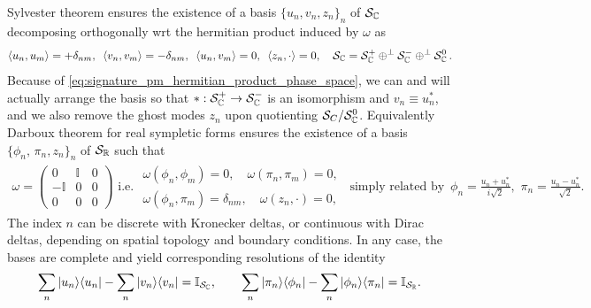 \documentclass[../QFT_main.tex]{subfiles}
\begin{document}
\begin{mytheorem}
Sylvester theorem ensures the existence of a basis $\{u_n, v_n, z_n\}_{n}$ of $\mathcal{S}_{\mathbb{C}}$ decomposing orthogonally wrt the hermitian product induced by $\omega$ as
\begin{align}\label{eq:orthogonality_bogoliubov_basis_complex_phase_space}
    \langle u_n, u_m \rangle = +\delta_{nm}, \,\,\, \langle v_n, v_m \rangle = -\delta_{nm}, \,\,\, \langle u_n, v_m \rangle = 0, \,\,\, \langle z_n, \cdot \rangle = 0, \quad \mathcal{S}_{\mathbb{C}} = \mathcal{S}_{\mathbb{C}}^+ \oplus^\perp \mathcal{S}_{\mathbb{C}}^- \oplus^\perp \mathcal{S}_{\mathbb{C}}^0\,.
\end{align}
Because of \eqref{eq:signature_pm_hermitian_product_phase_space}, we can and will actually arrange the basis so that $*:\mathcal{S}_{\mathbb{C}}^+ \to \mathcal{S}_{\mathbb{C}}^-$ is an isomorphism and $v_n \equiv u_n^*$, and we also remove the ghost modes $z_n$ upon quotienting $\mathcal{S}_C/\mathcal{S}_{\mathbb{C}}^0$.
Equivalently Darboux theorem for real sympletic forms ensures the existence of a basis $\{\phi_n, \, \pi_n, z_n\}_n$ of $\mathcal{S}_{\mathbb{R}}$ such that
{\small
\begin{align}
    \omega = \begin{pmatrix}
    0 & \mathbb{I} &0\\
    -\mathbb{I} & 0 & 0\\
    0 & 0 & 0
    \end{pmatrix}
    \,\,\text{i.e.}\,\,
    \begin{array}{l}
    \omega(\phi_n, \phi_m) = 0, \quad \omega(\pi_n, \pi_m) = 0,\\[2pt]
    \omega(\phi_n, \pi_m) = \delta_{nm}, \quad \omega(z_n, \cdot) = 0,
    \end{array}\,\,\,\text{simply related by}\,\,\,
    \phi_n= \frac{u_n+u_n^*}{i\sqrt{2}}, \,\,\pi_n = \frac{u_n-u_n^*}{\sqrt{2}}.
\end{align}}
%
The index $n$ can be discrete with Kronecker deltas, or continuous with Dirac deltas, depending on spatial topology and boundary conditions.
In any case, the bases are complete and yield corresponding resolutions of the identity 
\begin{align}\label{eq:completeness_symplectic_basis}
    \sum_n |u_n\rangle \langle u_n| - \sum_n |v_n\rangle \langle v_n| = \mathbb{I}_{\mathcal{S}_{\mathbb{C}}},\qquad 
    \sum_n |\pi_n\rangle \langle \phi_n| - \sum_n |\phi_n\rangle \langle \pi_n| = \mathbb{I}_{\mathcal{S}_{\mathbb{R}}}.
\end{align}
%


\end{mytheorem}
\end{document}
